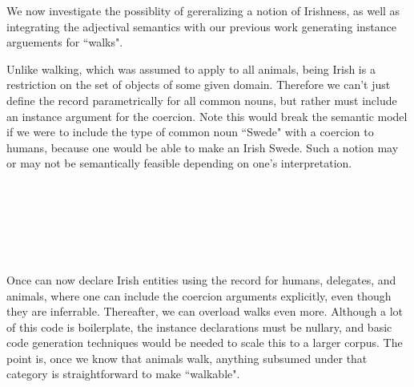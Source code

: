 We now investigate the possiblity of gereralizing a notion of Irishness, as well
as integrating the adjectival semantics with our previous work generating
instance arguements for ``walks".

Unlike walking, which was assumed to apply to all animals, being Irish is a
restriction on the set of objects of some given domain. Therefore we can't just
define the record parametrically for all common nouns, but rather must include
an instance argument for the coercion. Note this would break the semantic model
if we were to include the type of common noun ``Swede" with a coercion to
humans, because one would be able to make an Irish Swede. Such a notion may or
may not be semantically feasible depending on one's interpretation.

\begin{code}%
\>[0]\AgdaSpace{}%
\AgdaSpace{}%
\AgdaSymbol{(}\AgdaSpace{}%
\AgdaSymbol{:}\AgdaSpace{}%
\AgdaSymbol{)}\AgdaSpace{}%
\AgdaSymbol{\{\{}\AgdaSpace{}%
\AgdaSymbol{:}\AgdaSpace{}%
\AgdaSpace{}%
\AgdaSpace{}%
\AgdaSymbol{\}\}}\AgdaSpace{}%
\AgdaSymbol{:}\AgdaSpace{}%
\AgdaSpace{}%
\<%
\\
\>[0][@{}l@{\AgdaIndent{0}}]%
\>[2]\<%
\\
\>[2][@{}l@{\AgdaIndent{0}}]%
\>[4]\<%
\\
%
\>[2]\<%
\\
\>[2][@{}l@{\AgdaIndent{0}}]%
\>[4]\AgdaSpace{}%
\AgdaSymbol{:}\AgdaSpace{}%
\<%
\\
%
\>[4]\AgdaSpace{}%
\AgdaSymbol{:}\AgdaSpace{}%
\AgdaSpace{}%
\AgdaOperator{\AgdaFunction{\$}}\AgdaSpace{}%
\<%
\end{code}
\begin{code}[hide]%
\>[0]\AgdaSpace{}%
\AgdaSpace{}%
\AgdaSpace{}%
\<%
\end{code}

Once can now declare Irish entities using the record for humans, delegates, and
animals, where one can include the coercion arguments explicitly, even though
they are inferrable. Thereafter, we can overload walks even more. Although a lot
of this code is boilerplate, the instance declarations must be nullary, and
basic code generation techniques would be needed to scale this to a larger
corpus. The point is, once we know that animals walk, anything subsumed under
that category is straightforward to make ``walkable".

